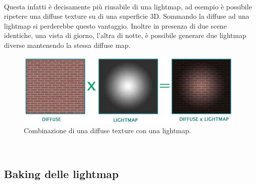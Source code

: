 \\
Questa infatti è decisamente più riusabile di una lightmap, ad esempio è possibile ripetere una diffuse texture su di una superficie 3D. Sommando la diffuse ad una lightmap si perderebbe questo vantaggio. Inoltre in presenza di due scene identiche, una vista di giorno, l’altra di notte, è possibile generare due lightmap diverse mantenendo la stessa diffuse map.
\\
\begin{figure}[htb]
 \centering
 \includegraphics[width=0.7\linewidth]{images/chapter_stato_arte/stato_arte_diffuse_lightmap.png}\hfill
 \caption[Combinazione texture/lightmap]{Combinazione di una diffuse texture con una lightmap.}
 \label{fig:stato_arte_diffuse_lightmap}
\end{figure}
\\
\subsection{Baking delle lightmap}
\label{sec:chapter_stato_arte_baking_lightmap}

